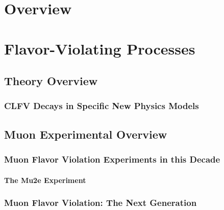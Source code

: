 \chapter{Overview}\label{sec:cl:over}
\medskip


\chapter{Flavor-Violating Processes}\label{sec:cl:over}
\medskip



\section{Theory Overview}\label{sec:cl:fvt}
\vskip -12pt


\subsection{CLFV Decays in Specific New Physics Models}
\vskip -12pt




\section{Muon Experimental Overview}\label{sec:cl:muexp}

\subsection{Muon Flavor Violation Experiments in this Decade}
\vskip -12pt
\subsubsection{The Mu2e Experiment}
\vskip -12pt


\subsection{Muon Flavor Violation: The Next Generation}

